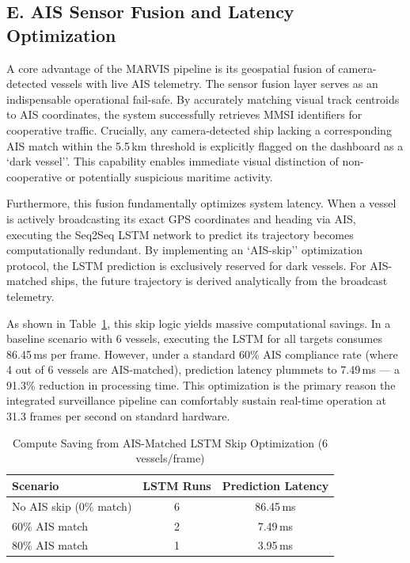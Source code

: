 \documentclass{ieeeaccess}
\begin{document}
\subsection*{E. AIS Sensor Fusion and Latency Optimization}

A core advantage of the MARVIS pipeline is its geospatial fusion of camera-detected vessels with live AIS telemetry. The sensor fusion layer serves as an indispensable operational fail-safe. By accurately matching visual track centroids to AIS coordinates, the system successfully retrieves MMSI identifiers for cooperative traffic. Crucially, any camera-detected ship lacking a corresponding AIS match within the 5.5\,km threshold is explicitly flagged on the dashboard as a `dark vessel''. This capability enables immediate visual distinction of non-cooperative or potentially suspicious maritime activity.

Furthermore, this fusion fundamentally optimizes system latency. When a vessel is actively broadcasting its exact GPS coordinates and heading via AIS, executing the Seq2Seq LSTM network to predict its trajectory becomes computationally redundant. By implementing an `AIS-skip'' optimization protocol, the LSTM prediction is exclusively reserved for dark vessels. For AIS-matched ships, the future trajectory is derived analytically from the broadcast telemetry. 

As shown in Table~\ref{tab:ais_skip}, this skip logic yields massive computational savings. In a baseline scenario with 6 vessels, executing the LSTM for all targets consumes 86.45\,ms per frame. However, under a standard 60\% AIS compliance rate (where 4 out of 6 vessels are AIS-matched), prediction latency plummets to 7.49\,ms --- a 91.3\% reduction in processing time. This optimization is the primary reason the integrated surveillance pipeline can comfortably sustain real-time operation at 31.3 frames per second on standard hardware.

\begin{table}[H]
\centering
\caption{Compute Saving from AIS-Matched LSTM Skip Optimization (6 vessels/frame)}
\label{tab:ais_skip}
\begin{tabular}{|l|c|c|}
\hline
\cellcolor{gray!30}\textbf{Scenario} & 
\cellcolor{gray!30}\textbf{LSTM Runs} & 
\cellcolor{gray!30}\textbf{Prediction Latency} \\
\hline
No AIS skip (0\% match) & 6 & 86.45\,ms \\
60\% AIS match          & 2 & 7.49\,ms \\
80\% AIS match          & 1 & 3.95\,ms \\
\hline
\end{tabular}
\end{table}
\end{document}
